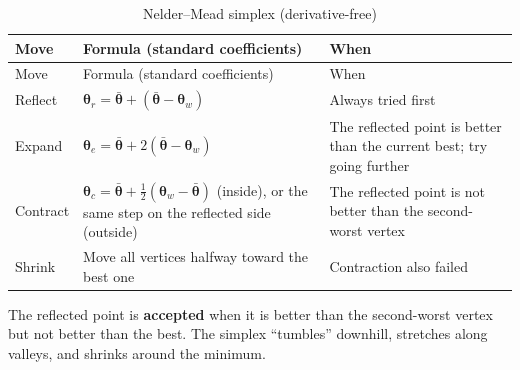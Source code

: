 \begin{longtable}[]{@{}
  >{\raggedright\arraybackslash}p{}
  >{\raggedright\arraybackslash}p{}
  >{\raggedright\arraybackslash}p{}@{}}
\caption{ Nelder--Mead simplex (derivative-free)}\tabularnewline
\toprule\noalign{}
\begin{minipage}[b]{\linewidth}\raggedright
Move
\end{minipage} & \begin{minipage}[b]{\linewidth}\raggedright
Formula (standard coefficients)
\end{minipage} & \begin{minipage}[b]{\linewidth}\raggedright
When
\end{minipage} \\
\midrule\noalign{}
\endfirsthead
\toprule\noalign{}
\begin{minipage}[b]{\linewidth}\raggedright
Move
\end{minipage} & \begin{minipage}[b]{\linewidth}\raggedright
Formula (standard coefficients)
\end{minipage} & \begin{minipage}[b]{\linewidth}\raggedright
When
\end{minipage} \\
\midrule\noalign{}
\endhead
\bottomrule\noalign{}
\endlastfoot
Reflect &
\(\boldsymbol\theta_r = \bar{\boldsymbol\theta} + (\bar{\boldsymbol\theta} - \boldsymbol\theta_w)\)
& Always tried first \\
Expand &
\(\boldsymbol\theta_e = \bar{\boldsymbol\theta} + 2(\bar{\boldsymbol\theta} - \boldsymbol\theta_w)\)
& The reflected point is better than the current best; try going
further \\
Contract &
\(\boldsymbol\theta_c = \bar{\boldsymbol\theta} + \tfrac{1}{2}(\boldsymbol\theta_w - \bar{\boldsymbol\theta})\)
(inside), or the same step on the reflected side (outside) & The
reflected point is not better than the second-worst vertex \\
Shrink & Move all vertices halfway toward the best one & Contraction
also failed \\
\end{longtable}

The reflected point is \textbf{accepted} when it is better than the
second-worst vertex but not better than the best. The simplex
``tumbles'' downhill, stretches along valleys, and shrinks around the
minimum.

